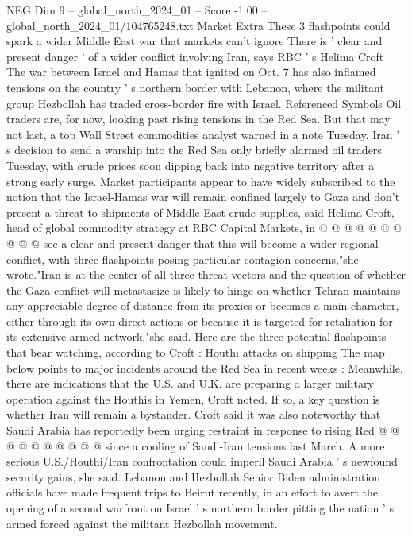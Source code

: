 \begin{textsample}{NEG Dim 9 – global\_north\_2024\_01 – Score -1.00 – global\_north\_2024\_01/104765248.txt}  \label{ex:f9_neg_194}
Market Extra These 3 flashpoints could spark a wider Middle East war that markets can't ignore There is ' clear and present danger ' of a wider conflict involving Iran, says RBC ' s Helima Croft The war between Israel and Hamas that ignited on Oct. 7 has also inflamed tensions on the country ' s northern border with Lebanon, where the militant group Hezbollah has traded cross-border fire with Israel.
Referenced Symbols Oil traders are, for now, looking past rising tensions in the Red Sea.
But that may not last, a top Wall Street commodities analyst warned in a note Tuesday.
Iran ' s decision to send a warship into the Red Sea only briefly alarmed oil traders Tuesday, with crude prices soon dipping back into negative territory after a strong early surge.
Market participants appear to have widely subscribed to the notion that the Israel-Hamas war will remain confined largely to Gaza and don't present a threat to shipments of Middle East crude supplies, said Helima Croft, head of global commodity strategy at RBC Capital Markets, in @ @ @ @ @ @ @ @ @ @ see a clear and present danger that this will become a wider regional conflict, with three flashpoints posing particular contagion concerns,"she wrote."Iran is at the center of all three threat vectors and the question of whether the Gaza conflict will metastasize is likely to hinge on whether Tehran maintains any appreciable degree of distance from its proxies or becomes a main character, either through its own direct actions or because it is targeted for retaliation for its extensive armed network,"she said.
Here are the three potential flashpoints that bear watching, according to Croft : Houthi attacks on shipping The map below points to major incidents around the Red Sea in recent weeks : Meanwhile, there are indications that the U.S. and U.K. are preparing a larger military operation against the Houthis in Yemen, Croft noted.
If so, a key question is whether Iran will remain a bystander.
Croft said it was also noteworthy that Saudi Arabia has reportedly been urging restraint in response to rising Red @ @ @ @ @ @ @ @ @ @ since a cooling of Saudi-Iran tensions last March.
A more serious U.S./Houthi/Iran confrontation could imperil Saudi Arabia ' s newfound security gains, she said.
Lebanon and Hezbollah Senior Biden administration officials have made frequent trips to Beirut recently, in an effort to avert the opening of a second warfront on Israel ' s northern border pitting the nation ' s armed forced against the militant Hezbollah movement.

\end{textsample}
